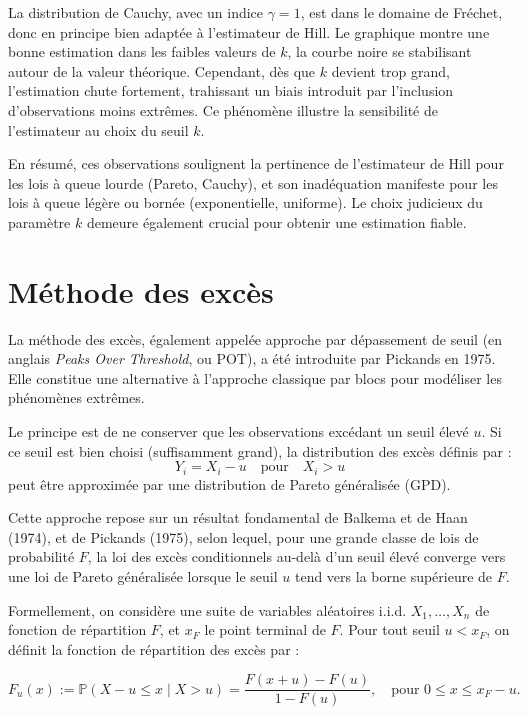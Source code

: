 \documentclass{article}
\begin{document}
La distribution de Cauchy, avec un indice $\gamma = 1$, est dans le domaine de Fréchet, donc en principe bien adaptée à l’estimateur de Hill. Le graphique montre une bonne estimation dans les faibles valeurs de $k$, la courbe noire se stabilisant autour de la valeur théorique. Cependant, dès que $k$ devient trop grand, l’estimation chute fortement, trahissant un biais introduit par l'inclusion d’observations moins extrêmes. Ce phénomène illustre la sensibilité de l’estimateur au choix du seuil $k$.
\medskip

En résumé, ces observations soulignent la pertinence de l’estimateur de Hill pour les lois à queue lourde (Pareto, Cauchy), et son inadéquation manifeste pour les lois à queue légère ou bornée (exponentielle, uniforme). Le choix judicieux du paramètre $k$ demeure également crucial pour obtenir une estimation fiable.

\section{Méthode des excès}

La méthode des excès, également appelée approche par dépassement de seuil (en anglais \textit{Peaks Over Threshold}, ou POT), a été introduite par Pickands en 1975. Elle constitue une alternative à l’approche classique par blocs pour modéliser les phénomènes extrêmes.

Le principe est de ne conserver que les observations excédant un seuil élevé \( u \). Si ce seuil est bien choisi (suffisamment grand), la distribution des excès définis par :
\[
Y_i = X_i - u \quad \text{pour} \quad X_i > u
\]
peut être approximée par une distribution de Pareto généralisée (GPD).

\medskip
Cette approche repose sur un résultat fondamental de Balkema et de Haan (1974), et de Pickands (1975), selon lequel, pour une grande classe de lois de probabilité \(F\), la loi des excès conditionnels au-delà d’un seuil élevé converge vers une loi de Pareto généralisée lorsque le seuil \(u\) tend vers la borne supérieure de \(F\).

\medskip
Formellement, on considère une suite de variables aléatoires i.i.d. \(X_1, \dots, X_n\) de fonction de répartition \(F\), et \(x_F\) le point terminal de \(F\). Pour tout seuil \(u < x_F\), on définit la fonction de répartition des excès par :

\[
F_u(x) := \mathbb{P}(X - u \leq x \mid X > u) = \frac{F(x + u) - F(u)}{1 - F(u)},
\quad \text{pour } 0 \leq x \leq x_F - u.
\]
\end{document}
